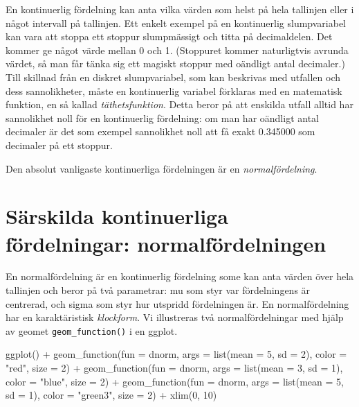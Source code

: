 \documentclass[
]{book}
\newenvironment{Shaded}{\begin{snugshade}}{\end{snugshade}}
\newcommand{\AttributeTok}[1]{\textcolor[rgb]{0.77,0.63,0.00}{#1}}
\newcommand{\DecValTok}[1]{\textcolor[rgb]{0.00,0.00,0.81}{#1}}
\newcommand{\FunctionTok}[1]{\textcolor[rgb]{0.00,0.00,0.00}{#1}}
\newcommand{\NormalTok}[1]{#1}
\newcommand{\SpecialCharTok}[1]{\textcolor[rgb]{0.00,0.00,0.00}{#1}}
\newcommand{\StringTok}[1]{\textcolor[rgb]{0.31,0.60,0.02}{#1}}
\theoremstyle{definition}
\theoremstyle{definition}
\theoremstyle{definition}
\theoremstyle{definition}
\theoremstyle{remark}
\begin{document}
En kontinuerlig fördelning kan anta vilka värden som helst på hela tallinjen eller i något intervall på tallinjen. Ett enkelt exempel på en kontinuerlig slumpvariabel kan vara att stoppa ett stoppur slumpmässigt och titta på decimaldelen. Det kommer ge något värde mellan 0 och 1. (Stoppuret kommer naturligtvis avrunda värdet, så man får tänka sig ett magiskt stoppur med oändligt antal decimaler.) Till skillnad från en diskret slumpvariabel, som kan beskrivas med utfallen och dess sannolikheter, måste en kontinuerlig variabel förklaras med en matematisk funktion, en så kallad \emph{täthetsfunktion}. Detta beror på att enskilda utfall alltid har sannolikhet noll för en kontinuerlig fördelning: om man har oändligt antal decimaler är det som exempel sannolikhet noll att få exakt 0.345000 som decimaler på ett stoppur.

Den absolut vanligaste kontinuerliga fördelningen är en \emph{normalfördelning}.

\hypertarget{suxe4rskilda-kontinuerliga-fuxf6rdelningar-normalfuxf6rdelningen}{%
\section{Särskilda kontinuerliga fördelningar: normalfördelningen}\label{suxe4rskilda-kontinuerliga-fuxf6rdelningar-normalfuxf6rdelningen}}

En normalfördelning är en kontinuerlig fördelning some kan anta värden över hela tallinjen och beror på två parametrar: mu som styr var fördelningens är centrerad, och sigma som styr hur utspridd fördelningen är.
En normalfördelning har en karaktäristisk \emph{klockform}. Vi illustreras två normalfördelningar med hjälp av geomet \texttt{geom\_function()} i en ggplot.

\begin{Shaded}
\begin{Highlighting}[]
\FunctionTok{ggplot}\NormalTok{() }\SpecialCharTok{+}
  \FunctionTok{geom\_function}\NormalTok{(}\AttributeTok{fun =}\NormalTok{ dnorm, }\AttributeTok{args =} \FunctionTok{list}\NormalTok{(}\AttributeTok{mean =} \DecValTok{5}\NormalTok{, }\AttributeTok{sd =} \DecValTok{2}\NormalTok{), }\AttributeTok{color =} \StringTok{"red"}\NormalTok{, }\AttributeTok{size =} \DecValTok{2}\NormalTok{) }\SpecialCharTok{+}
  \FunctionTok{geom\_function}\NormalTok{(}\AttributeTok{fun =}\NormalTok{ dnorm, }\AttributeTok{args =} \FunctionTok{list}\NormalTok{(}\AttributeTok{mean =} \DecValTok{3}\NormalTok{, }\AttributeTok{sd =} \DecValTok{1}\NormalTok{), }\AttributeTok{color =} \StringTok{"blue"}\NormalTok{, }\AttributeTok{size =} \DecValTok{2}\NormalTok{) }\SpecialCharTok{+}
  \FunctionTok{geom\_function}\NormalTok{(}\AttributeTok{fun =}\NormalTok{ dnorm, }\AttributeTok{args =} \FunctionTok{list}\NormalTok{(}\AttributeTok{mean =} \DecValTok{5}\NormalTok{, }\AttributeTok{sd =} \DecValTok{1}\NormalTok{), }\AttributeTok{color =} \StringTok{"green3"}\NormalTok{, }\AttributeTok{size =} \DecValTok{2}\NormalTok{) }\SpecialCharTok{+}
  \FunctionTok{xlim}\NormalTok{(}\DecValTok{0}\NormalTok{, }\DecValTok{10}\NormalTok{)}
\end{Highlighting}
\end{Shaded}
\end{document}
